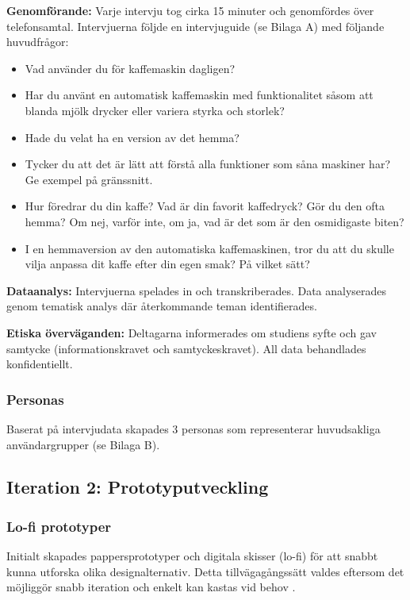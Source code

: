 \textbf{Genomförande:} Varje intervju tog cirka 15 minuter och genomfördes över telefonsamtal. Intervjuerna följde en intervjuguide (se Bilaga A) med följande huvudfrågor:
\begin{itemize}
    \item Vad använder du för kaffemaskin dagligen? 
    \item Har du använt en automatisk kaffemaskin med funktionalitet såsom att blanda mjölk drycker eller variera styrka och storlek?
    \item Hade du velat ha en version av det hemma? 
    \item Tycker du att det är lätt att förstå alla funktioner som såna maskiner har? Ge exempel på gränssnitt. 
    \item Hur föredrar du din kaffe? Vad är din favorit kaffedryck? Gör du den ofta hemma? Om nej, varför inte, om ja, vad är det som är den osmidigaste biten? 
    \item I en hemmaversion av den automatiska kaffemaskinen, tror du att du skulle vilja anpassa dit kaffe efter din egen smak? På vilket sätt? 
\end{itemize}

\textbf{Dataanalys:} Intervjuerna spelades in och transkriberades. Data analyserades genom tematisk analys där återkommande teman identifierades.

\textbf{Etiska överväganden:} Deltagarna informerades om studiens syfte och gav samtycke (informationskravet och samtyckeskravet). All data behandlades konfidentiellt.


\subsubsection{Personas}

Baserat på intervjudata skapades 3 personas som representerar huvudsakliga användargrupper (se Bilaga B). %


\subsection{Iteration 2: Prototyputveckling}

\subsubsection{Lo-fi prototyper}


Initialt skapades pappersprototyper och digitala skisser (lo-fi) för att snabbt kunna utforska olika designalternativ. Detta tillvägagångssätt valdes eftersom det möjliggör snabb iteration och enkelt kan kastas vid behov \cite{sharp2019}.

